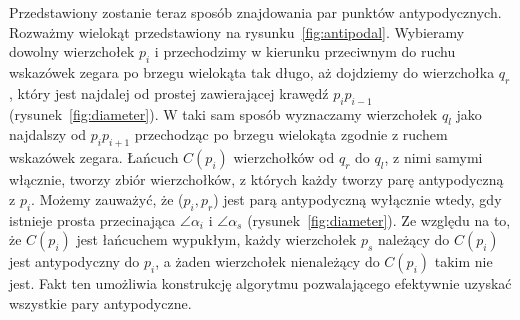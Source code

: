 Przedstawiony zostanie teraz sposób znajdowania par punktów
antypodycznych. Rozważmy wielokąt przedstawiony na
rysunku~\ref{fig:antipodal}. Wybieramy dowolny wierzchołek $p_i$ i
przechodzimy w kierunku przeciwnym do ruchu wskazówek zegara po brzegu
wielokąta tak długo, aż dojdziemy do wierzchołka $q_r$, który jest
najdalej od prostej zawierającej krawędź $p_{i}p_{i-1}$
(rysunek~\ref{fig:diameter}). W taki sam sposób wyznaczamy wierzchołek
$q_l$ jako najdalszy od $p_{i}p_{i+1}$ przechodząc po brzegu wielokąta
zgodnie z ruchem wskazówek zegara. Łańcuch $C(p_i)$ wierzchołków od
$q_r$ do $q_l$, z nimi samymi włącznie, tworzy zbiór wierzchołków, z
których każdy tworzy parę antypodyczną z $p_i$. Możemy zauważyć, że
($p_{i},p_{r}$) jest parą antypodyczną wyłącznie wtedy, gdy istnieje
prosta przecinająca $\angle \alpha_i$ i $\angle \alpha_s$
(rysunek~\ref{fig:diameter}). Ze względu na to, że $C(p_i)$ jest
łańcuchem wypukłym, każdy wierzchołek $p_s$ należący do $C(p_i)$ jest
antypodyczny do $p_i$, a żaden wierzchołek nienależący do $C(p_i)$
takim nie jest. Fakt ten umożliwia konstrukcję algorytmu pozwalającego
efektywnie uzyskać wszystkie pary antypodyczne.

